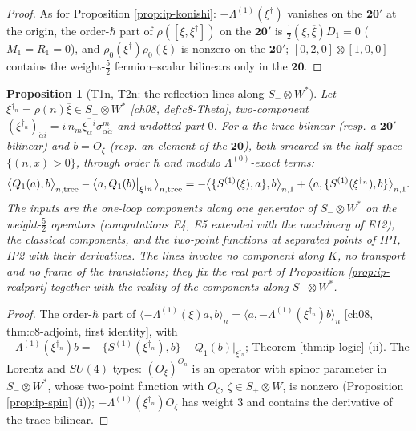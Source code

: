 \documentclass[11pt]{report}
\theoremstyle{plain}
\newtheorem{proposition}[theorem]{Proposition}
\theoremstyle{definition}
\numberwithin{equation}{chapter}
\begin{document}
\begin{proof}
As for Proposition \ref{prop:ip-konishi}: $-\Lambda^{(1)}(\xi^\dagger)$ vanishes on the $\mathbf{20'}$ at the origin, the order-$\hbar$ part of $\rho([\xi,\xi^\dagger])$ on the $\mathbf{20'}$ is $\tfrac12(\xi,\overline\xi)D_1=0$ ($M_1=R_1=0$), and $\rho_0(\xi^\dagger)\rho_0(\xi)$ is nonzero on the $\mathbf{20'}$; $[0,2,0]\otimes[1,0,0]$ contains the weight-$\tfrac52$ fermion--scalar bilinears only in the $\mathbf{20}$.
\end{proof}

\begin{proposition}[T1n, T2n: the reflection lines along $S_-\otimes W^*$]
\label{prop:ip-reflline}
Let $\xi^{\dagger_n}=\rho(n)\overline\xi\in S_-\otimes W^*$ [ch08, def:c8-Theta], two-component $(\xi^{\dagger_n})_{\dot\alpha i}=i\,n_m\overline{\xi_\alpha{}^i}\sigma^m_{\alpha\dot\alpha}$ and undotted part $0$. For $a$ the trace bilinear (resp. a $\mathbf{20'}$ bilinear) and $b=O_\zeta$ (resp. an element of the $\mathbf{20}$), both smeared in the half space $\{(n,x)>0\}$, through order $\hbar$ and modulo $\Lambda^{(0)}$-exact terms:
\begin{equation}
\big\langle Q_1(a),b\big\rangle_{n,{\rm tree}}-\big\langle a,Q_1(b)\big|_{\xi^{\dagger_n}}\big\rangle_{n,{\rm tree}}=-\big\langle\{S^{(1)}(\xi),a\},b\big\rangle_{n,1}+\big\langle a,\{S^{(1)}(\xi^{\dagger_n}),b\}\big\rangle_{n,1}.
\label{eq:ip-reflline}
\end{equation}
The inputs are the one-loop components along one generator of $S_-\otimes W^*$ on the weight-$\tfrac52$ operators (computations E4, E5 extended with the machinery of E12), the classical components, and the two-point functions at separated points of IP1, IP2 with their derivatives. The lines involve no component along $K$, no transport and no frame of the translations; they fix the real part of Proposition \ref{prop:ip-realpart} together with the reality of the components along $S_-\otimes W^*$.
\end{proposition}

\begin{proof}
The order-$\hbar$ part of $\langle-\Lambda^{(1)}(\xi)a,b\rangle_n=\langle a,-\Lambda^{(1)}(\xi^{\dagger_n})b\rangle_n$ [ch08, thm:c8-adjoint, first identity], with $-\Lambda^{(1)}(\xi^{\dagger_n})b=-\{S^{(1)}(\xi^{\dagger_n}),b\}-Q_1(b)|_{\xi^{\dagger_n}}$; Theorem \ref{thm:ip-logic} (ii). The Lorentz and $SU(4)$ types: $(O_\xi)^{\Theta_n}$ is an operator with spinor parameter in $S_-\otimes W^*$, whose two-point function with $O_\zeta$, $\zeta\in S_+\otimes W$, is nonzero (Proposition \ref{prop:ip-spin} (i)); $-\Lambda^{(1)}(\xi^{\dagger_n})O_\zeta$ has weight $3$ and contains the derivative of the trace bilinear.
\end{proof}
\end{document}
